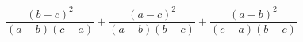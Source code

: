 \begin{ex}[type=expression]
	\begin{condition}
		\( \dfrac{(b-c)^2}{(a-b)(c-a)}+\dfrac{(a-c)^2}{(a-b)(b-c)}+\dfrac{(a-b)^2}{(c-a)(b-c)} \)
	\end{condition}
\end{ex}